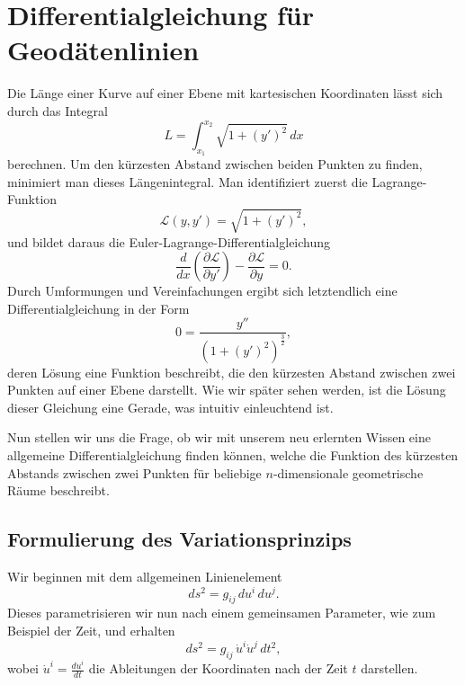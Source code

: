 %
%
%
%
\section{Differentialgleichung für Geodätenlinien
\label{geodaeten:section:Standardverfahren}}

Die Länge einer Kurve auf einer Ebene mit kartesischen Koordinaten lässt sich durch das Integral
\begin{equation}
	L = \int_{x_1}^{x_2} \sqrt{1 + \left(y'\right)^2} \, dx
\end{equation}
berechnen.
Um den kürzesten Abstand zwischen beiden Punkten zu finden, minimiert man dieses Längenintegral.
Man identifiziert zuerst die Lagrange-Funktion
\begin{equation}
	\mathcal{L}(y, y') = \sqrt{1 + \left(y'\right)^2},
\end{equation}
und bildet daraus die Euler-Lagrange-Differentialgleichung
\begin{equation}
	\frac{d}{dx} \left(\frac{\partial \mathcal{L}}{\partial y'}\right) - \frac{\partial \mathcal{L}}{\partial y} = 0.
\end{equation}
Durch Umformungen und Vereinfachungen ergibt sich letztendlich eine Differentialgleichung in der Form
\begin{equation}
	0 = \frac{y''}{\left(1 + \left(y'\right)^2\right)^{\frac{3}{2}}},
\end{equation}
deren Lösung eine Funktion beschreibt, die den kürzesten Abstand zwischen zwei Punkten auf einer Ebene darstellt. Wie wir später sehen werden, ist die Lösung dieser Gleichung eine Gerade, was intuitiv einleuchtend ist.

Nun stellen wir uns die Frage, ob wir mit unserem neu erlernten Wissen eine allgemeine Differentialgleichung finden können, welche die Funktion des kürzesten Abstands zwischen zwei Punkten für beliebige $n$-dimensionale geometrische Räume beschreibt.

\subsection{Formulierung des Variationsprinzips}
Wir beginnen mit dem allgemeinen Linienelement
\begin{equation}
	ds^2 = g_{i\!j} \, du^i \, du^j.
\end{equation}
Dieses parametrisieren wir nun nach einem gemeinsamen Parameter, wie zum Beispiel der Zeit, und erhalten
\begin{equation}
	ds^2 = g_{i\!j} \, \dot{u}^i \dot{u}^j \, dt^2,
\end{equation}
wobei $\dot{u}^i = \frac{du^i}{dt}$ die Ableitungen der Koordinaten nach der Zeit $t$ darstellen.

